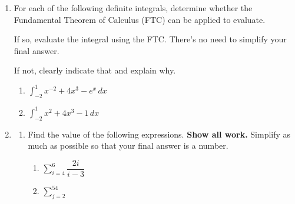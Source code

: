 \documentclass[11pt]{article}
\begin{document}
\begin{enumerate}

\newpage


\item For each of the following definite integrals, determine whether the Fundamental Theorem of Calculus (FTC) can be applied to evaluate. 

If so, evaluate the integral using the FTC. There's no need to simplify your final answer.

If not, clearly indicate that and explain why.

\begin{enumerate}
    \item $\displaystyle\int_{-2}^{1}x^{-2}+4x^3-e^x\, dx$

    \vfill

    \item $\displaystyle\int_{-2}^1x^2+4x^3-1\, dx$

    \vfill
\end{enumerate}


\newpage


\item \begin{enumerate}
    \item Find the value of the following expressions. \textbf{Show all work.} Simplify as much as possible so that your final answer is a number.

    \begin{enumerate}
        \item[(i)] $\displaystyle\sum_{i=4}^6\dfrac{2i}{i-3}$

        \vfill

        \item[(ii)] $\displaystyle\sum_{j=2}^54$ 

        \vfill
    \end{enumerate}


\end{enumerate}
\end{enumerate}
\end{document}
